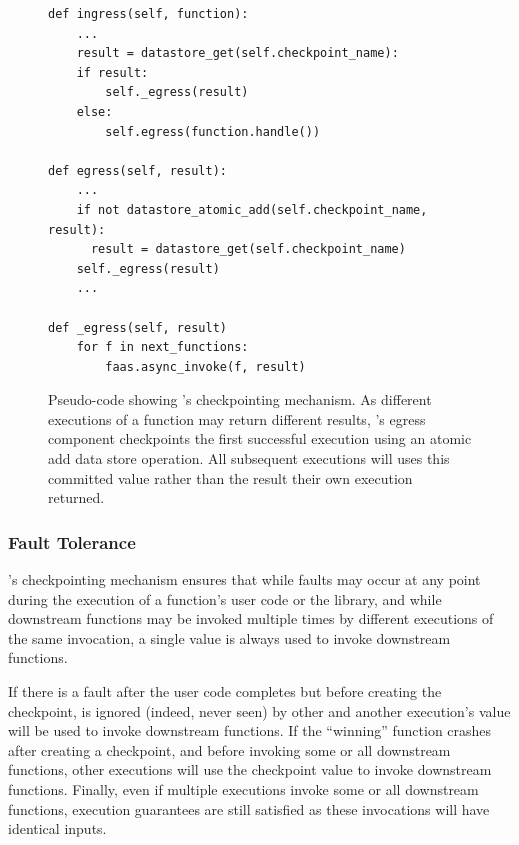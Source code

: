 \begin{figure}
\begin{verbatim}
def ingress(self, function):
    ...
    result = datastore_get(self.checkpoint_name):
    if result:
        self._egress(result)
    else:
        self.egress(function.handle())

def egress(self, result):
    ...
    if not datastore_atomic_add(self.checkpoint_name, result):
      result = datastore_get(self.checkpoint_name)
    self._egress(result)
    ...

def _egress(self, result)
    for f in next_functions:
        faas.async_invoke(f, result)
\end{verbatim}
\caption{Pseudo-code showing \name{}'s checkpointing mechanism. As different
executions of a function may return different results, \name{}'s egress
component checkpoints the first successful execution using an atomic add
data store operation. All subsequent executions will uses this committed value
rather than the result their own execution returned.}
\label{fig:design:checkpoint}
\end{figure}

\subsubsection{Fault Tolerance}


\name{}'s checkpointing mechanism ensures that while faults may occur at any
point during the execution of a function's user code or the \name{} library,
and while downstream functions may be invoked multiple times by different
executions of the same invocation, a single value is always used to invoke
downstream functions.

If there is a fault after the user code completes but before creating the
checkpoint,  is ignored (indeed, never seen) by
other  and another execution's value will be used to
invoke downstream functions.  If the ``winning'' function crashes after
creating a checkpoint, and before invoking some or all downstream functions,
other executions will use the checkpoint value to invoke downstream functions.
Finally, even if multiple executions invoke some or all downstream functions,
execution guarantees are still satisfied as these invocations will have
identical inputs.

